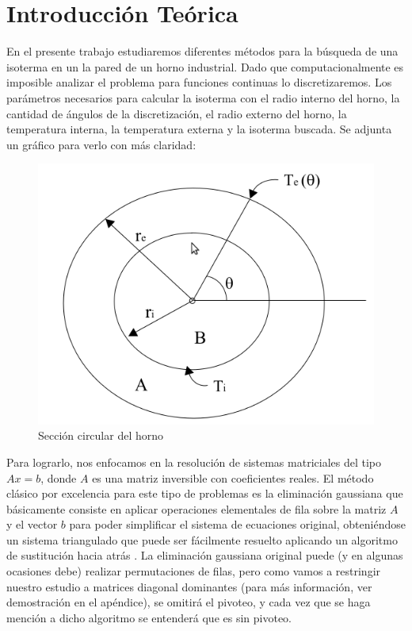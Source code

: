 \section{Introducción Teórica}
%
En el presente trabajo estudiaremos diferentes métodos para la búsqueda de una isoterma en un la pared de un
horno industrial. Dado que computacionalmente es imposible analizar el problema para
funciones continuas lo discretizaremos. Los parámetros necesarios para calcular la isoterma con
el radio interno del horno, la cantidad de ángulos de la discretización, el radio externo del horno, 
la temperatura interna, la temperatura externa y la isoterma buscada. Se adjunta un gráfico para verlo con más claridad:

\begin{figure}[ht]
  \begin {center}
    \includegraphics[width=0.6\columnwidth]{Horno.png}
    \caption{Sección circular del horno}
  \end{center}
\end{figure}

Para lograrlo, nos enfocamos en la resolución de sistemas matriciales del tipo $Ax=b$,
donde $A$ es una matriz inversible con coeficientes reales. El método clásico por excelencia para
este tipo de problemas es la eliminación gaussiana que básicamente consiste en aplicar operaciones
elementales de fila sobre la matriz $A$ y el vector $b$ para poder simplificar el sistema de
ecuaciones original, obteniéndose un sistema triangulado que puede ser fácilmente resuelto aplicando
un algoritmo de sustitución hacia atrás \cite[6.1]{burden}. La eliminación gaussiana original puede
(y en algunas ocasiones debe) realizar permutaciones de filas, pero como vamos a restringir nuestro
estudio a matrices diagonal dominantes (para más información, ver demostración en el apéndice), se
omitirá el pivoteo, y cada vez que se haga mención a dicho algoritmo se entenderá que es sin
pivoteo.

